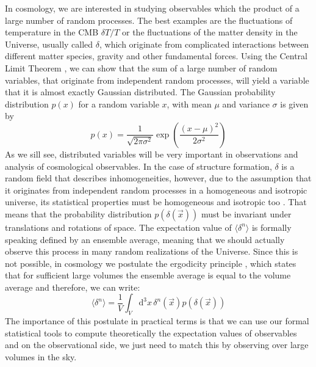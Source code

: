 In cosmology, we are interested in studying observables which  the product of a large number of random processes.
The best examples are the fluctuations of temperature in the CMB $\delta T / T$ or the fluctuations of the matter density in the Universe, 
usually called $\delta$, which originate from complicated interactions between different matter species, gravity and other fundamental forces.
Using the Central Limit Theorem \cite{(cite...)}, we can show that the sum of a large number of random variables, that originate from independent random processes, will yield a variable that it is almost exactly Gaussian distributed. The Gaussian probability distribution $p(x)$ for a random variable $x$, with mean $\mu$ and variance $\sigma$ is given by
\begin{equation}
p(x) = \frac{1}{\sqrt{2 \pi \sigma^2}}\exp\left( \frac{(x-\mu)^2}{2\sigma^2} \right)
\end{equation}
As we sill see,  distributed variables will be very important in observations and analysis of cosmological observables.
In the case of structure formation, $\delta$ is a random field that describes inhomogeneities, however, due to the 
assumption that it originates from independent random processes in a homogeneous and isotropic universe,
its statistical properties must be homogeneous and isotropic too \cite{(cite...Peacock, Bjoern, ?)}.
That means that the probability distribution $p(\delta(\vec{x}))$ must be invariant under translations and rotations of space.
The expectation value of $\langle \delta^n \rangle$ is formally speaking defined by an ensemble average, meaning that
we should actually observe this process in many random realizations of the Universe. Since this is not possible,
in cosmology we postulate the ergodicity principle \cite{(cite Adler...)}, which states that for sufficient large volumes
the ensemble average is equal to the volume average and therefore, we can write:
\begin{equation}
\langle \delta^n \rangle = \frac{1}{V} \int_V \mathrm{d}^3 x \, \delta^n (\vec{x}) p(\delta (\vec{x}))
\end{equation} 
The importance of this postulate in practical terms is that we can use our formal statistical tools 
to compute theoretically the expectation values
of observables  and on the observational side, we just need to match this by observing over large volumes in the sky.

